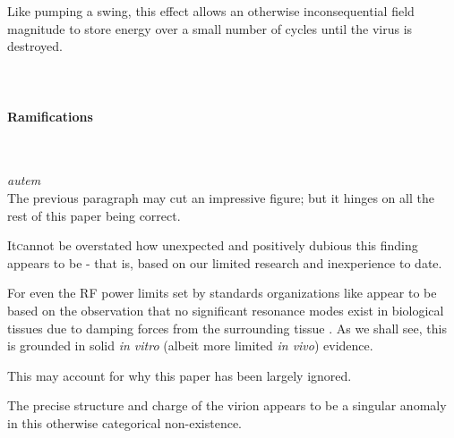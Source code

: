 \documentclass[paper.tex]{subfiles}
\begin{document}
\begin{multicols}{1}
Like pumping a swing, this effect allows an otherwise inconsequential field magnitude to store energy over a small number of cycles until the virus is destroyed. \\
\\\\

\paragraph{Ramifications}\



\begin{autem}
	
	{\it autem}\\
	The previous paragraph may cut an impressive figure; but it hinges on all the rest of this paper being correct.
	
\end{autem}

\lettrine{It} cannot be overstated how unexpected and positively dubious this finding appears to be - that is, based on our limited research and inexperience to date.

For even the RF power limits set by standards organizations like \cite{ICNIRP2020} \cite{IEEE2006} appear to be based on the observation that no significant resonance modes exist in biological tissues due to damping forces from the surrounding tissue \cite{Vibrational2002}. As we shall see, this is grounded in solid {\it in vitro} (albeit more limited {\it in vivo}) evidence. 

This may account for why this paper has been largely ignored.

The precise structure and charge of the virion appears to be a singular anomaly in this otherwise categorical non-existence.




\end{multicols}
\end{document}
